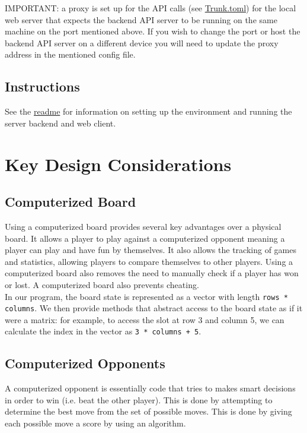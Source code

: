 \documentclass{article}
\begin{document}
IMPORTANT: a proxy is set up for the API calls (see \href{run: ../Trunk.toml}{Trunk.toml}) for the local web server that expects the backend API server to be running on the same machine on the port mentioned above.
If you wish to change the port or host the backend API server on a different device you will need to update the proxy address in the mentioned config file.

\subsection{Instructions}

See the \href{run:../README.md}{readme} for information on setting up the environment and running the server backend and web client.

\section{Key Design Considerations}

\subsection{Computerized Board}
Using a computerized board provides several key advantages over a physical board. It allows a player to play against a computerized opponent meaning a player can play and have fun by themselves. It also allows the tracking of games and statistics, allowing players to compare themselves to other players. Using a computerized board also removes the need to manually check if a player has won or lost. A computerized board also prevents cheating. \\

In our program, the board state is represented as a vector with length \texttt{rows * columns}. We then provide methods that abstract access to the board state as if it were a matrix: for example, to access the slot at row 3 and column 5, we can calculate the index in the vector as \texttt{3 * columns + 5}.

\subsection{Computerized Opponents}
A computerized opponent is essentially code that tries to makes smart decisions in order to win (i.e. beat the other player). This is done by attempting to determine the best move from the set of possible moves. This is done by giving each possible move a score by using an algorithm. \\
\end{document}
